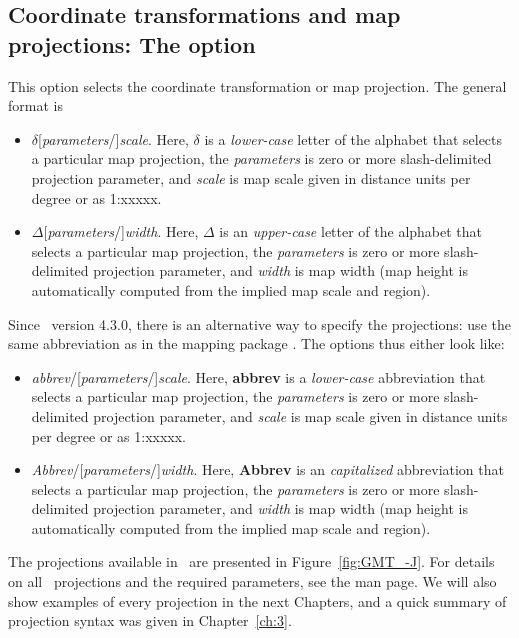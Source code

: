 \subsection{Coordinate transformations and map projections: The  option}

This option selects the coordinate transformation or map projection.  The general format is
\begin{itemize}
\item {}$\delta$[\emph{parameters}/]\emph{scale}.  Here, $\delta$ is a \emph{lower-case}
letter of the alphabet that selects a particular map projection, the \emph{parameters}
is zero or more slash-delimited projection parameter, and \emph{scale} is map scale given in
distance units per degree or as 1:xxxxx.
\item {}$\Delta$[\emph{parameters}/]\emph{width}.  Here, $\Delta$ is an \emph{upper-case}
letter of the alphabet that selects a particular map projection, the \emph{parameters}
is zero or more slash-delimited projection parameter, and \emph{width} is map width (map
height is automatically computed from the implied map scale and region).
\end{itemize}
Since \GMT\ version 4.3.0, there is an alternative way to specify the projections: use the same abbreviation as in the mapping package . The options thus either look like:
\begin{itemize}
\item {}\emph{abbrev}/[\emph{parameters}/]\emph{scale}.  Here, \textbf{abbrev} is a \emph{lower-case}
abbreviation that selects a particular map projection, the \emph{parameters}
is zero or more slash-delimited projection parameter, and \emph{scale} is map scale given in
distance units per degree or as 1:xxxxx.
\item {}\emph{Abbrev}/[\emph{parameters}/]\emph{width}.  Here, \textbf{Abbrev} is an \emph{capitalized} abbreviation that selects a particular map projection, the \emph{parameters}
is zero or more slash-delimited projection parameter, and \emph{width} is map width (map
height is automatically computed from the implied map scale and region).
\end{itemize}


The projections available in \GMT\ are presented in Figure~\ref{fig:GMT_-J}.
For details on all \GMT\ projections and the required parameters, see the  man page.
We will also show examples of every projection in the next Chapters, and a quick
summary of projection syntax was given in Chapter~\ref{ch:3}.

